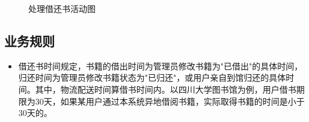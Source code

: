 \begin{figure}[H]
    \centering  %
    \caption{处理借还书活动图}
    \label{处理借还书活动图}
\end{figure}
\subsection{业务规则}
\begin{itemize}
    \item 借还书时间规定，书籍的借出时间为管理员修改书籍为"已借出"的具体时间，归还时间为管理员修改书籍状态为"已归还"，或用户亲自到馆归还的具体时间。其中，物流配送时间算借书时间内。以四川大学图书馆为例，用户借书期限为30天，如果某用户通过本系统异地借阅书籍，实际取得书籍的时间是小于30天的。    
\end{itemize}
